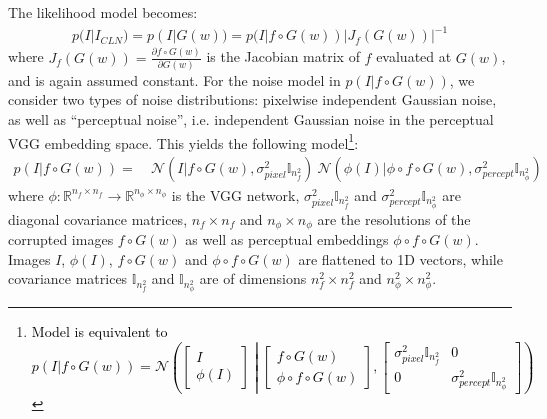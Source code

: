 \documentclass{article}
\newcommand{\mc}[1]{\mathbb{#1}}
\newcommand{\ci}[1]{\circ{#1}}
\newcommand{\modifcolor}{black}
\newcommand{\tc}[1]{\textcolor{\modifcolor}{#1}}
\begin{document}
The likelihood model becomes:
\begin{equation}
\begin{aligned}
 \label{likelihoodDefJac}
p(I|I_{CLN}) = p(I|G(w)) = p(I|f \ci G(w)) |J_f\left(G(w)\right)|^{-1}
\end{aligned}
 \end{equation}
 where $ J_f\left(G(w)\right) = \frac{\partial f \ci G(w)}{\partial G(w)}$ is the Jacobian matrix of $f$ evaluated at $G(w)$, and is again assumed constant. For the noise model in $p(I|f \ci G(w))$, we consider two types of noise distributions: pixelwise independent Gaussian noise, as well as ``perceptual noise'', i.e. independent Gaussian noise in the perceptual VGG embedding space. This yields the following model\footnote{\tc{Model is equivalent to $p(I|f \ci G(w)) = \mathcal{N}\left(\begin{bmatrix} I\\ \phi(I) \end{bmatrix} \middle| \begin{bmatrix} f \ci G(w) \\ \phi \ci f \ci G(w) \end{bmatrix}, \begin{bmatrix} \sigma_{pixel}^2 \mc{I}_{n_{f}^2} & 0 \\ 0 & \sigma_{percept}^2 \mc{I}_{n_{\phi}^2} \end{bmatrix} \right)$}}:
\begin{equation}
\begin{aligned}
 \label{likelihoodDef}
  p(I|f \ci G(w)) = &\ \mathcal{N}(I|f \ci G(w), \sigma_{pixel}^2 \mc{I}_{n_f^2})\ \mathcal{N}(\phi(I)|\phi \ci f \ci G(w), \sigma_{percept}^2 \mc{I}_{n_{\phi}^2})
\end{aligned}
 \end{equation}
where $\phi: \mc{R}^{n_f \times n_f} \to \mc{R}^{n_\phi \times n_\phi}$ is the VGG network, $\sigma_{pixel}^2 \mc{I}_{n_f^2}$ and $\sigma_{percept}^2 \mc{I}_{n_{\phi}^2}$ are diagonal covariance matrices, $n_f \times n_f$ and $n_\phi \times n_\phi$ are the resolutions of the corrupted images $f \ci G(w)$ as well as perceptual embeddings $\phi \ci f \ci G(w)$. Images $I$, $\phi(I)$, $f \ci G(w)$ and $\phi \ci f \ci G(w)$ are flattened to 1D vectors, while covariance matrices $\mc{I}_{n_f^2}$ and $\mc{I}_{n_{\phi}^2}$ are of dimensions $n_f^2 \times n_f^2$ and $n_\phi^2 \times n_\phi^2$.
 
\end{document}
